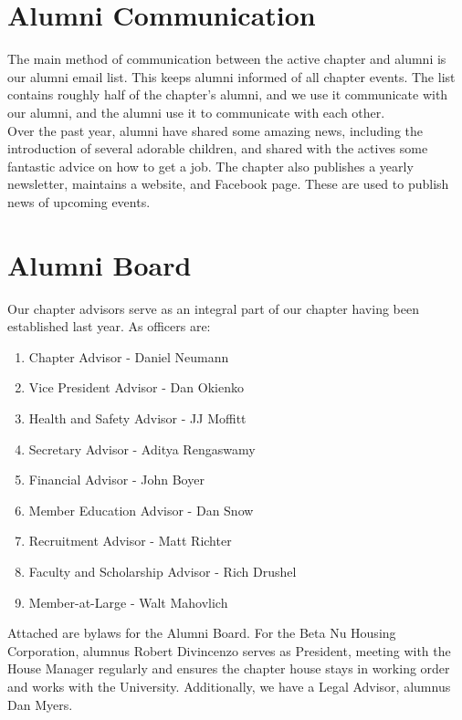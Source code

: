   \section*{Alumni Communication}
    The main method of communication between the active chapter and alumni is our alumni email list. This keeps alumni informed of all chapter events. The list contains roughly half of the chapter’s alumni, and we use it communicate with our alumni, and the alumni use it to communicate with each other. \\

    Over the past year, alumni have shared some amazing news, including the introduction of several adorable children, and shared with the actives some fantastic advice on how to get a job. The chapter also publishes a yearly newsletter, maintains a website, and Facebook page. These are used to publish news of upcoming events.
    
  \section*{Alumni Board}
    Our chapter advisors serve as an integral part of our chapter having been established last year. As officers are:
      \begin{enumerate}
       \item Chapter Advisor - Daniel Neumann
       \item Vice President Advisor - Dan Okienko
       \item Health and Safety Advisor - JJ Moffitt
       \item Secretary Advisor - Aditya Rengaswamy
	   \item Financial Advisor - John Boyer
       \item Member Education Advisor - Dan Snow
       \item Recruitment Advisor - Matt Richter
       \item Faculty and Scholarship Advisor - Rich Drushel
       \item Member-at-Large - Walt Mahovlich
       
      \end{enumerate}

   Attached are bylaws for the Alumni Board. For the Beta Nu Housing Corporation, alumnus Robert Divincenzo serves as President, meeting with the House Manager regularly and ensures the chapter house stays in working order and works with the University. Additionally, we have a Legal Advisor, alumnus Dan Myers. 
    
